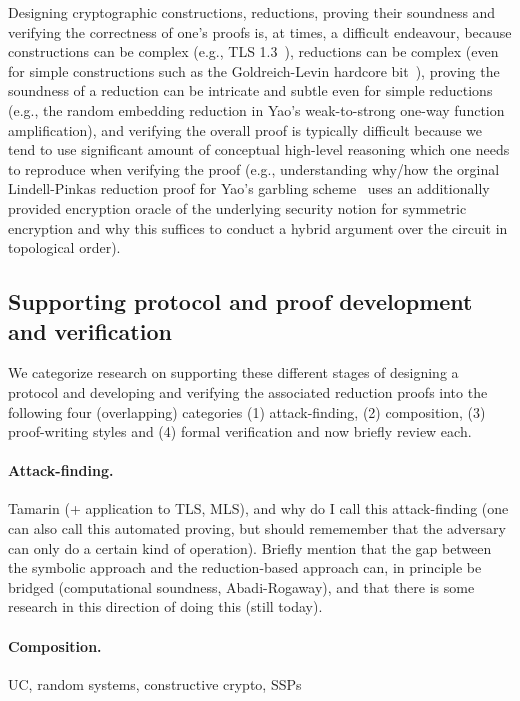 Designing cryptographic constructions, reductions, proving their soundness and verifying the correctness of one's proofs is, at times, a difficult endeavour, because constructions can be complex (e.g., TLS 1.3~\cite{X}), reductions can be complex (even for simple constructions such as the Goldreich-Levin hardcore bit~\cite{X}), proving the soundness of a reduction can be intricate and subtle even for simple reductions (e.g., the random embedding reduction in Yao's weak-to-strong one-way function amplification), and verifying the overall proof is typically difficult because we tend to use significant amount of conceptual high-level reasoning which one needs to reproduce when verifying the proof (e.g., understanding why/how the orginal Lindell-Pinkas reduction proof for Yao's garbling scheme~\cite{X} uses an additionally provided encryption oracle of the underlying security notion for symmetric encryption and why this suffices to conduct a hybrid argument over the circuit in topological order).

\subsection{Supporting protocol and proof development and verification}
We categorize research on supporting these different stages of designing a protocol and developing and verifying the associated reduction proofs into the following four (overlapping) categories (1) attack-finding, (2) composition, (3) proof-writing styles and (4) formal verification and now briefly review each.

{\color{blue}
\paragraph{Attack-finding.} Tamarin (+ application to TLS, MLS), and why do I call this attack-finding (one can also call this automated proving, but should rememember that the adversary can only do a certain kind of operation). Briefly mention that the gap between the symbolic approach and the reduction-based approach can, in principle be bridged (computational soundness, Abadi-Rogaway), and that there is some research in this direction of doing this (still today).

\paragraph{Composition.} UC, random systems, constructive crypto, SSPs}

